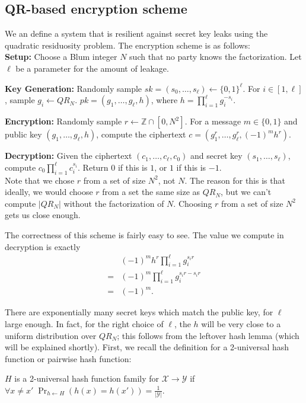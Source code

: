 \documentclass[10pt]{article}
\newcommand{\bit}{\{0,1\}}
\begin{document}
\subsection{QR-based encryption scheme}

We an define a system that is resilient against secret key leaks using the quadratic residuosity problem. The encryption scheme is as follows:
\\

\textbf{Setup:} Choose a Blum integer $N$ such that no party knows the factorization. Let $\ell$ be a parameter for the amount of leakage.

\textbf{Key Generation:} Randomly sample  $sk = (s_0,\dots,s_\ell) \leftarrow \{0,1\}^\ell$. For $i \in [1,\ell]$, sample $g_i \leftarrow QR_N$. $pk = (g_1,\dots,g_\ell,h)$, where $h = \prod_{i=1}^\ell g_i^{-s_i}$.

\textbf{Encryption:} Randomly sample $r \leftarrow \mathbb{Z} \cap [0,N^2]$. For a message $m \in \bit$ and public key $(g_1,\dots,g_\ell,h)$, compute the ciphertext $c = (g_1^r,\dots,g_\ell^r,(-1)^m h^r)$. 

\textbf{Decryption:} Given the ciphertext $(c_1,\dots,c_\ell,c_0)$ and secret key $(s_1,\dots,s_\ell)$, compute $c_0 \prod_{i=1}^\ell c_i^{s_i}$. Return $0$ if this is $1$, or $1$ if this is $-1$.
\\

Note that we chose $r$ from a set of size $N^2$, not $N$. The reason for this is that ideally, we would choose $r$ from a set the same size as $QR_N$, but we can't compute $|QR_N|$ without the factorization of $N$. Choosing $r$ from a set of size $N^2$ gets us close enough.

The correctness of this scheme is fairly easy to see. The value we compute in decryption is exactly 
\begin{align*}
&(-1)^m h^r \prod_{i=1}^\ell g_i^{s_i r}
\\ = &(-1)^m \prod_{i=1}^\ell g_i^{s_i r - s_i r}
\\ = &(-1)^m.
\end{align*}

There are exponentially many secret keys which match the public key, for $\ell$ large enough. In fact, for the right choice of $\ell$, the $h$ will be very close to a uniform distribution over $QR_N$; this follows from the leftover hash lemma (which will be explained shortly). First, we recall the definition for a 2-universal hash function or pairwise hash function:

\begin{definition}
$H$ is a 2-universal hash function family for $\mathcal{X} \rightarrow \mathcal{Y}$ if $\forall x \neq x' \; \Pr_{h \leftarrow H}(h(x) = h(x')) = \frac{1}{|\mathcal{Y}|}$.
\end{definition}
\end{document}
